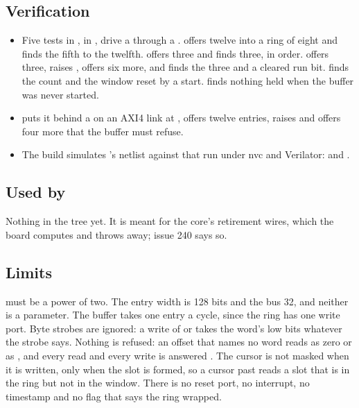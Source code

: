 \subsection*{Verification}

\begin{itemize}
\item Five tests in , in
, drive a  through a
.  offers
twelve into a ring of eight and finds the fifth to the twelfth.
\allowbreak{} offers three and
finds three, in order.  offers three,
raises , offers six more, and finds the three and a cleared
run bit.  finds the count and the
window reset by a start.  finds
nothing held when the buffer was never started.
\item {} puts it behind a
 on an AXI4 link at , offers twelve
entries, raises  and offers four more that the buffer must
refuse.
\item The build simulates 's netlist against that run
under nvc and Verilator:
 and
.
\end{itemize}

\subsection*{Used by}

Nothing in the tree yet. It is meant for the core's retirement wires,
which the board computes and throws away; issue 240 says so.

\subsection*{Limits}

 must be a power of two. The entry width is 128 bits and the
bus 32, and neither is a parameter. The buffer takes one entry a cycle,
since the ring has one write port. Byte strobes are ignored: a write of
 or  takes the word's low bits whatever the
strobe says. Nothing is refused: an offset that names no word reads as
zero or as , and every read and every write is answered
. The cursor is not masked when it is written, only when the
slot is formed, so a cursor past  reads a slot that is in
the ring but not in the window. There is no reset port, no interrupt,
no timestamp and no flag that says the ring wrapped.
